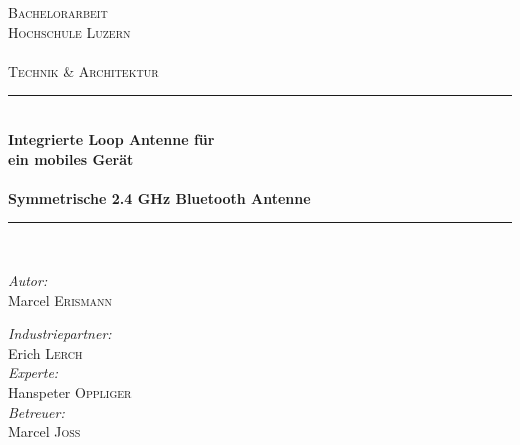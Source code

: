 \begin{titlepage}

\begin{center}

\textsc{\LARGE Bachelorarbeit}\\[1.5cm]

\textsc{\Large Hochschule Luzern\\
    ~\\
    Technik \& Architektur}\\[0.5cm]

\vfill{}

\newcommand{\HRule}{\rule{\linewidth}{0.5mm}}
\HRule \\[0.4cm]
{   \Huge \bfseries Integrierte Loop Antenne für \\ein mobiles Gerät\\
        ~\\
        \large Symmetrische 2.4 GHz Bluetooth Antenne}\\[0.4cm]

\HRule \\[1.5cm]

\begin{minipage}{0.4\textwidth}
    \begin{flushleft} \large
        \emph{Autor:}\\
        Marcel \textsc{Erismann}\\
    \end{flushleft}
\end{minipage}
\hfill
\begin{minipage}{0.4\textwidth}
    \begin{flushright} \large
          \emph{Industriepartner:} \\
         Erich \textsc{Lerch}\\
         \vspace{0.5cm}
         \emph{Experte:} \\
         Hanspeter  \textsc{Oppliger}\\
         \vspace{0.5cm}
         \emph{Betreuer:} \\
         Marcel  \textsc{Joss}
    \end{flushright}
\end{minipage}


\end{center}
\end{titlepage}
